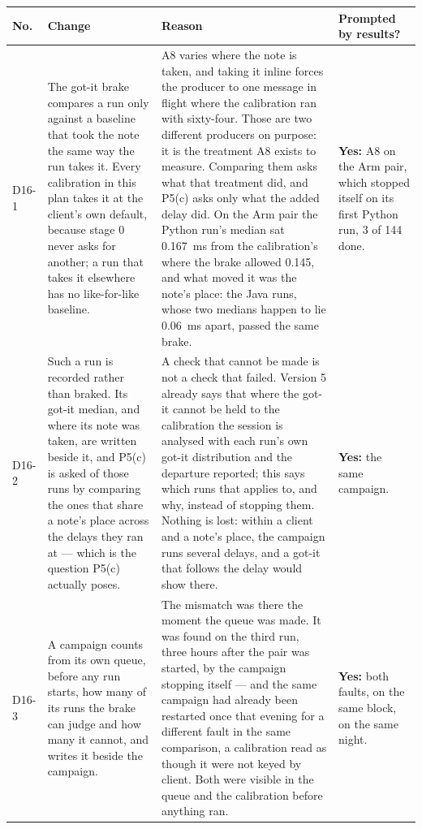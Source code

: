 \documentclass[11pt]{article}
\begin{document}
{\small
\begin{longtable}{@{}p{1.1cm} >{\raggedright\arraybackslash}p{6.1cm} >{\raggedright\arraybackslash}p{6.0cm} >{\raggedright\arraybackslash}p{2.2cm}@{}}
\toprule
\textbf{No.} & \textbf{Change} & \textbf{Reason} & \textbf{Prompted by results?} \\
\midrule
\endhead
D16-1 & The got-it brake compares a run only against a baseline that took the note the same way the run takes it. Every calibration in this plan takes it at the client's own default, because stage 0 never asks for another; a run that takes it elsewhere has no like-for-like baseline. & A8 varies where the note is taken, and taking it inline forces the producer to one message in flight where the calibration ran with sixty-four. Those are two different producers on purpose: it is the treatment A8 exists to measure. Comparing them asks what that treatment did, and P5(c) asks only what the added delay did. On the Arm pair the Python run's median sat 0.167~ms from the calibration's where the brake allowed 0.145, and what moved it was the note's place: the Java runs, whose two medians happen to lie 0.06~ms apart, passed the same brake. & \textbf{Yes:} A8 on the Arm pair, which stopped itself on its first Python run, 3 of 144 done. \\
D16-2 & Such a run is recorded rather than braked. Its got-it median, and where its note was taken, are written beside it, and P5(c) is asked of those runs by comparing the ones that share a note's place across the delays they ran at --- which is the question P5(c) actually poses. & A check that cannot be made is not a check that failed. Version 5 already says that where the got-it cannot be held to the calibration the session is analysed with each run's own got-it distribution and the departure reported; this says which runs that applies to, and why, instead of stopping them. Nothing is lost: within a client and a note's place, the campaign runs several delays, and a got-it that follows the delay would show there. & \textbf{Yes:} the same campaign. \\
D16-3 & A campaign counts from its own queue, before any run starts, how many of its runs the brake can judge and how many it cannot, and writes it beside the campaign. & The mismatch was there the moment the queue was made. It was found on the third run, three hours after the pair was started, by the campaign stopping itself --- and the same campaign had already been restarted once that evening for a different fault in the same comparison, a calibration read as though it were not keyed by client. Both were visible in the queue and the calibration before anything ran. & \textbf{Yes:} both faults, on the same block, on the same night. \\
\bottomrule
\end{longtable}}
\end{document}
